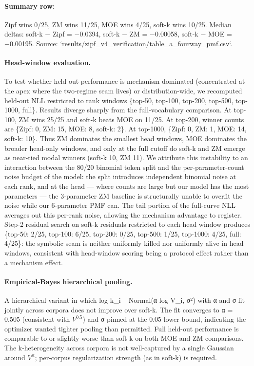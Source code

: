 \documentclass[11pt]{article}
\begin{document}


\paragraph{Summary row:} Zipf wins 0/25, ZM wins 11/25, MOE wins 4/25, soft-k wins 10/25. Median deltas: soft-k − Zipf = −0.0394, soft-k − ZM = −0.00058, soft-k − MOE = −0.00195. Source: `results/zipf\_v4\_verification/table\_a\_fourway\_pmf.csv`.

\paragraph{Head-window evaluation.} To test whether held-out performance is mechanism-dominated (concentrated at the apex where the two-regime seam lives) or distribution-wide, we recomputed held-out NLL restricted to rank windows \{top-50, top-100, top-200, top-500, top-1000, full\}. Results diverge sharply from the full-vocabulary comparison. At top-100, ZM wins 25/25 and soft-k beats MOE on 11/25. At top-200, winner counts are \{Zipf: 0, ZM: 15, MOE: 8, soft-k: 2\}. At top-1000, \{Zipf: 0, ZM: 1, MOE: 14, soft-k: 10\}. Thus ZM dominates the smallest head windows, MOE dominates the broader head-only windows, and only at the full cutoff do soft-k and ZM emerge as near-tied modal winners (soft-k 10, ZM 11). We attribute this instability to an interaction between the 80/20 binomial token split and the per-parameter-count noise budget of the model: the split introduces independent binomial noise at each rank, and at the head — where counts are large but our model has the most parameters — the 3-parameter ZM baseline is structurally unable to overfit the noise while our 6-parameter PMF can. The tail portion of the full-curve NLL averages out this per-rank noise, allowing the mechanism advantage to register. Step-2 residual search on soft-k residuals restricted to each head window produces \{top-50: 2/25, top-100: 6/25, top-200: 0/25, top-500: 1/25, top-1000: 4/25, full: 4/25\}: the symbolic seam is neither uniformly killed nor uniformly alive in head windows, consistent with head-window scoring being a protocol effect rather than a mechanism effect.

\paragraph{Empirical-Bayes hierarchical pooling.} A hierarchical variant in which log k\_i ~ Normal(α log V\_i, σ²) with α and σ fit jointly across corpora does not improve over soft-k. The fit converges to α = 0.505 (consistent with $V^{0.5}$) and σ pinned at the 0.05 lower bound, indicating the optimizer wanted tighter pooling than permitted. Full held-out performance is comparable to or slightly worse than soft-k on both MOE and ZM comparisons. The k-heterogeneity across corpora is not well-captured by a single Gaussian around $V^{\alpha}$; per-corpus regularization strength (as in soft-k) is required.
\end{document}
